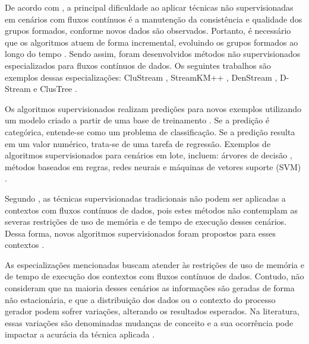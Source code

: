 \documentclass[msc, classic, a4paper]{ufbathesis}
\begin{document}
De acordo com , a principal dificuldade ao aplicar técnicas não supervisionadas em cenários com fluxos contínuos é a manutenção da consistência e qualidade dos grupos formados, conforme novos dados são observados.
Portanto, é necessário que os algoritmos atuem de forma incremental, evoluindo os grupos formados ao longo do tempo \cite{Barbara:2002:RCD:507515.507519}.
Sendo assim, foram desenvolvidos métodos não supervisionados especializados para fluxos contínuos de dados.
Os seguintes trabalhos são exemplos dessas especializações:
CluStream \cite{Aggarwal:2003:FCE:1315451.1315460},
StreamKM++ \cite{Ackermann:2012:SCA:2133803.2184450},
DenStream \cite{Cao:Feng:Ester},
D-Stream \cite{Chen:Tu} e ClusTree \cite{Kranen:2011:CIM:2134350.2134352}.

Os algoritmos supervisionados realizam predições para novos exemplos utilizando um modelo criado a partir de uma base de treinamento \cite{Kotsiantis:2007:SML:1566770.1566773}.
Se a predição é categórica, entende-se como um problema de classificação.
Se a predição resulta em um valor numérico, trata-se de uma tarefa de regressão.
Exemplos de algoritmos supervisionados para cenários em lote, incluem:
árvores de decisão \cite{Breiman:Classification_Regression_Trees},
métodos baseados em regras,
redes neurais e máquinas de vetores suporte (SVM) \cite{Vapnik1998}.

Segundo ,
as técnicas supervisionadas tradicionais não podem ser aplicadas a contextos com fluxos contínuos de dados,
pois estes métodos não contemplam as severas restrições de uso de memória e de tempo de execução desses cenários.
%
Dessa forma,
novos algoritmos supervisionados foram propostos para esses contextos \cite{Domingos:2000:MHD:347090.347107, Bifet:2013:EDS:2480362.2480516, Wang:2003:MCD:956750.956778, Aggarwal:2004:DCD:1014052.1014110, Gama:2003:ADT:956750.956813}.

As especializações mencionadas buscam atender às restrições de uso de memória e de tempo de execução dos contextos com fluxos contínuos de dados.
Contudo, não consideram que na maioria desses cenários as informações são geradas de forma não estacionária, e que a distribuição dos dados ou o contexto do processo gerador podem sofrer variações, alterando os resultados esperados.
Na literatura, essas variações são denominadas mudanças de conceito e a sua ocorrência pode impactar a acurácia da técnica aplicada \cite{Gama:2010:KDD:1855075}.

\end{document}
